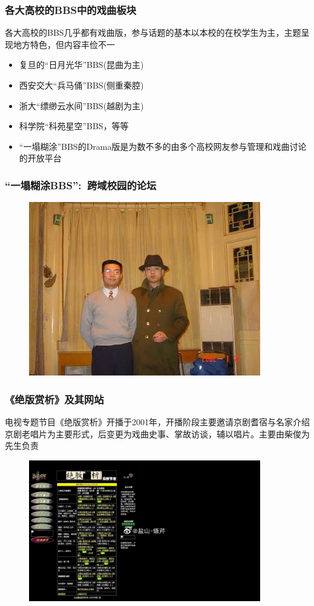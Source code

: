 \documentclass[cjk,slidestop,compress,mathserif,blue]{beamer}
\begin{document}
\frame
{
	\frametitle{各大高校的\rm{BBS}中的戏曲板块}
各大高校的\textrm{BBS}几乎都有戏曲版，参与话题的基本以本校的在校学生为主，主题呈现地方特色，但内容丰俭不一
	\begin{itemize}
   		\setlength{\itemsep}{15pt}
		\item 复旦的“日月光华”\textrm{BBS}(昆曲为主)
		\item 西安交大“兵马俑”\textrm{BBS}(侧重秦腔)
		\item 浙大“缥缈云水间”\textrm{BBS}(越剧为主)
		\item 科学院“科苑星空”\textrm{BBS}，等等
		\item “一塌糊涂”\textrm{BBS}的\textrm{Drama}版是为数不多的由多个高校网友参与管理和戏曲讨论的开放平台
	\end{itemize}
}

\frame
{
	\frametitle{“一塌糊涂\rm{BBS}”:~跨域校园的论坛}
\begin{figure}[h!]
\centering
\vspace{-0.2in}
\includegraphics[height=0.70\textwidth,width=0.90\textwidth,clip]{Figures_Peking-Opera/PekOpe_Hutu-1.jpg}
\label{THU}
\end{figure}
}

\frame
{
	\frametitle{《绝版赏析》及其网站}
	电视专题节目《绝版赏析》开播于2001年，开播阶段主要邀请京剧耆宿与名家介绍京剧老唱片为主要形式，后变更为戏曲史事、掌故访谈，辅以唱片。主要由柴俊为先生负责
\begin{figure}[h!]
\centering
\vspace{-0.05in}
\includegraphics[height=0.55\textwidth,width=0.90\textwidth,clip]{Figures_Peking-Opera/PekOpe_Jueban.jpg}
\label{Jueban}
\end{figure}
}
\end{document}
